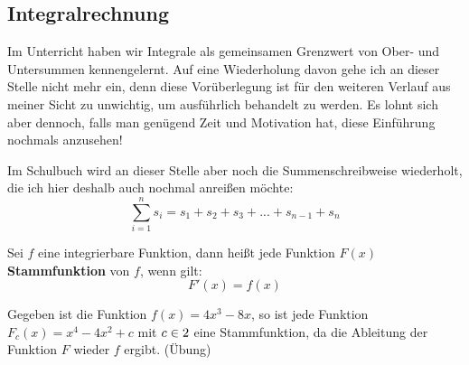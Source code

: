 \documentclass[ngerman, 12pt]{nssheetxea}
\begin{document}
\subsection{Integralrechnung}
Im Unterricht haben wir Integrale als gemeinsamen Grenzwert von Ober- und Untersummen kennengelernt. Auf eine Wiederholung davon gehe ich an dieser Stelle nicht mehr ein, denn diese Vorüberlegung ist für den weiteren Verlauf aus meiner Sicht zu unwichtig, um ausführlich behandelt zu werden. Es lohnt sich aber dennoch, falls man genügend Zeit und Motivation hat, diese Einführung nochmals anzusehen! \par
Im Schulbuch wird an dieser Stelle aber noch die Summenschreibweise wiederholt, die ich hier deshalb auch nochmal anreißen möchte:
\[ \sum_{i=1}^n s_i = s_1 + s_2 + s_3 + ... + s_{n-1} + s_n  \]
\begin{definition}
Sei $f$ eine integrierbare Funktion, dann heißt jede Funktion $F(x)$ \textbf{Stammfunktion} von $f$, wenn gilt:
\[ F'(x)=f(x) \]
 
\end{definition}

\begin{example}
Gegeben ist die Funktion $f(x)=4x^3-8x$, so ist jede Funktion $F_c(x)=x^4-4x^2+c$ mit $c\in 2$ eine Stammfunktion, da die Ableitung der Funktion $F$ wieder $f$ ergibt. (Übung)
\begin{center}
\end{center}


\end{example}
\end{document}

